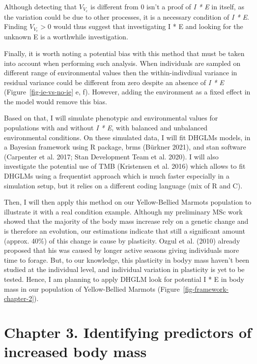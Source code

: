 \documentclass[
  12pt,
  letterpaper,
]{scrartcl}
\begin{document}
Although detecting that \(V_{V_e}\) is different from 0 isn't a proof of
\emph{I * E} in itself, as the variation could be due to other
processes, it is a necessary condition of \emph{I * E}. Finding
\(V_{V_e} > 0\) would thus suggest that investigating I * E and looking
for the unknown E is a worthwhile investigation.

Finally, it is worth noting a potential bias with this method that must
be taken into account when performing such analysis. When individuals
are sampled on different range of environmental values then the
within-indivdiual variance in residual variance could be different from
zero despite an absence of \emph{I * E} (Figure~\ref{fig-ie-vs-no-ie} e,
f). However, adding the environment as a fixed effect in the model would
remove this bias.

Based on that, I will simulate phenotypic and environmental values for
populations with and without \emph{I * E}, with balanced and unbalanced
environmental conditions. On these simulated data, I will fit DHGLMs
models, in a Bayesian framework using R package, brms (Bürkner 2021),
and stan software (Carpenter et al. 2017; Stan Development Team et al.
2020). I will also investigate the potential use of TMB (Kristensen et
al. 2016) which allows to fit DHGLMs using a frequentist approach which
is much faster especially in a simulation setup, but it relies on a
different coding language (mix of R and C).

Then, I will then apply this method on our Yellow-Bellied Marmots
population to illustrate it with a real condition example. Although my
preliminary MSc work showed that the majority of the body mass increase
rely on a genetic change and is therefore an evolution, our estimations
indicate that still a significant amount (approx. 40\%) of this change
is cause by plasticity. Ozgul et al. (2010) already proposed that his
was caused by longer active seasons giving individuals more time to
forage. But, to our knowledge, this plasticity in bodyy mass haven't
been studied at the individual level, and individual variation in
plasticity is yet to be tested. Hence, I am planning to apply DHGLM look
for potential I * E in body mass in our population of Yellow-Bellied
Marmots (Figure~\ref{fig-framework-chapter-2}).

\newpage{}

\section{Chapter 3. Identifying predictors of increased body
mass}\label{sec-chap3}
\end{document}
